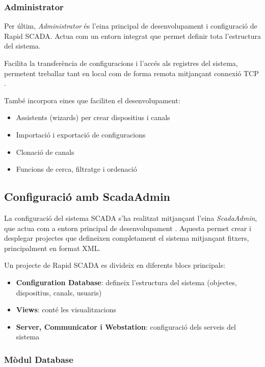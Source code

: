 \documentclass[a4paper,11pt,DIV=13,headings=normal,abstract=true,twoside=semi]{article}
\begin{document}
\subsubsection*{Administrator}

Per últim, \textit{Administrator} és l'eina principal de desenvolupament i configuració de Rapid SCADA. Actua com un entorn integrat que permet definir tota l'estructura del sistema.

Facilita la transferència de configuracions i l'accés als registres del sistema, permetent treballar tant en local com de forma remota mitjançant connexió TCP \cite{rapidscada_apps}.


També incorpora eines que faciliten el desenvolupament:
\begin{itemize}
    \item Assistents (wizards) per crear dispositius i canals
    \item Importació i exportació de configuracions
    \item Clonació de canals
    \item Funcions de cerca, filtratge i ordenació
\end{itemize}



\subsection{Configuració amb ScadaAdmin}

La configuració del sistema SCADA s'ha realitzat mitjançant l'eina \textit{ScadaAdmin}, que actua com a entorn principal de desenvolupament \cite{rapidscada_config_basics}. Aquesta permet crear i desplegar projectes que defineixen completament el sistema mitjançant fitxers, principalment en format XML.

Un projecte de Rapid SCADA es divideix en diferents blocs principals:

\begin{itemize}
    \item \textbf{Configuration Database}: defineix l'estructura del sistema (objectes, dispositius, canals, usuaris)
    \item \textbf{Views}: conté les visualitzacions
    \item \textbf{Server, Communicator i Webstation}: configuració dels serveis del sistema
\end{itemize}

\subsubsection{Mòdul Database}
\end{document}
